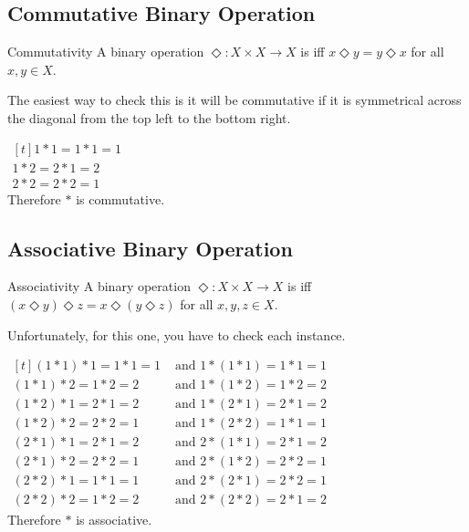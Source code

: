\documentclass[\main/notes.tex]{subfiles}
\begin{document}
			\subsection{Commutative Binary Operation}
				\begin{definition}{Commutativity}
					A binary operation $\Diamond: X \times X \rightarrow X$ is  iff $x \Diamond y = y \Diamond x$ for all $x, y \in X$.
				\end{definition}
				The easiest way to check this is it will be commutative if it is symmetrical across the diagonal from the top left to the bottom right.
				\begin{example}[width=0.35\textwidth] $
					\begin{aligned}[t]
						1 * 1 = 1 * 1 = 1\\
						1 * 2 = 2 * 1 = 2\\
						2 * 2 = 2 * 2 = 1
					\end{aligned} $\\
					Therefore $*$ is commutative.
				\end{example}
			\subsection{Associative Binary Operation}
				\begin{definition}{Associativity}
					A binary operation $\Diamond: X \times X \rightarrow X$ is  iff $(x \Diamond y) \Diamond z = x \Diamond (y \Diamond z)$ for all $x, y, z \in X$.
				\end{definition}
				Unfortunately, for this one, you have to check each instance.
				\begin{example}[width=0.65\textwidth] $
					\begin{aligned}[t]
						(1 * 1) * 1 = 1 * 1 = 1 &\text{ and } 1 * (1 * 1) = 1 * 1 = 1\\
						(1 * 1) * 2 = 1 * 2 = 2 &\text{ and } 1 * (1 * 2) = 1 * 2 = 2\\
						(1 * 2) * 1 = 2 * 1 = 2 &\text{ and } 1 * (2 * 1) = 2 * 1 = 2\\
						(1 * 2) * 2 = 2 * 2 = 1 &\text{ and } 1 * (2 * 2) = 1 * 1 = 1\\
						(2 * 1) * 1 = 2 * 1 = 2 &\text{ and } 2 * (1 * 1) = 2 * 1 = 2\\
						(2 * 1) * 2 = 2 * 2 = 1 &\text{ and } 2 * (1 * 2) = 2 * 2 = 1\\
						(2 * 2) * 1 = 1 * 1 = 1 &\text{ and } 2 * (2 * 1) = 2 * 2 = 1\\
						(2 * 2) * 2 = 1 * 2 = 2 &\text{ and } 2 * (2 * 2) = 2 * 1 = 2
					\end{aligned} $\\
					Therefore $*$ is associative.
				\end{example}
			\pagebreak
\end{document}
